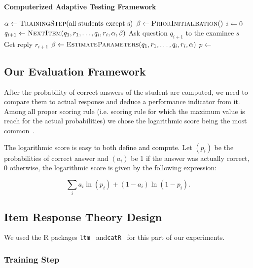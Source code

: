 \documentclass{sig-alternate}
\begin{document}
\begin{algorithm}
\caption*{\textbf{Computerized Adaptive Testing Framework}}
\begin{algorithmic}
	\State $\alpha \gets \Call{TrainingStep}{\text{all students except s}}$
	\State $\beta \gets \Call{PriorInitialisation}$
	\State $i \gets 0$
		\State $q_{i + 1} \gets \Call{NextItem}{q_1, r_1, \ldots, q_i, r_i, \alpha, \beta}$
		\State Ask question $q_{i + 1}$ to the examinee $s$
		\State Get reply $r_{i + 1}$
		\State $\beta \gets \Call{EstimateParameters}{q_1, r_1, \ldots, q_i, r_i, \alpha}$
	\EndWhile
	\State $p \gets$ 
	\State {}
\EndFor
\EndProcedure
\end{algorithmic}
\end{algorithm}

\subsection{Our Evaluation Framework}

After the probability of correct answers of the student are computed, we need to compare them to actual response and deduce a performance indicator from it. Among all proper scoring rule (i.e. scoring rule for which the maximum value is reach for the actual probabilities) we chose the logarithmic score being the most common~\citep{Gneiting2007}.

The logarithmic score is easy to both define and compute. Let $(p_i)$ be the probabilities of correct answer and $(a_i)$ be 1 if the answer was actually correct, 0 otherwise, the logarithmic score is given by the following expression: 

\[ \sum_i a_i\ln(p_i) + (1-a_i)\ln(1-p_i).\]

\subsection{Item Response Theory Design}

We used the R packages \texttt{ltm}~\citep{Rizopoulos2006} and\linebreak \texttt{catR}~\citep{MagisRaiche2012} for this part of our experiments.

\subsubsection{Training Step}
\end{document}
